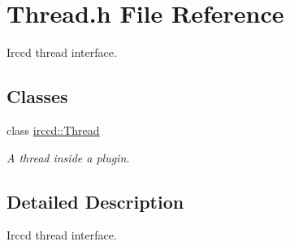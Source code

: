 \hypertarget{a00149}{\section{Thread.\-h File Reference}
\label{a00149}
}


Irccd thread interface.  


\subsection*{Classes}
\begin{DoxyCompactItemize}
\item 
class \hyperlink{a00068}{irccd\-::\-Thread}
\begin{DoxyCompactList}\small\item\em A thread inside a plugin. \end{DoxyCompactList}\end{DoxyCompactItemize}


\subsection{Detailed Description}
Irccd thread interface. 